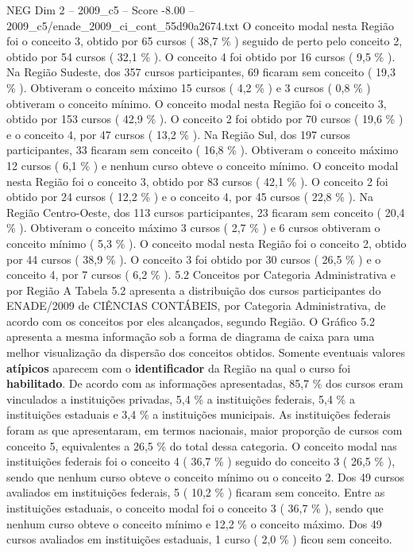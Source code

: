 \begin{textsample}{NEG Dim 2 – 2009\_c5 – Score -8.00 – 2009\_c5/enade\_2009\_ci\_cont\_55d90a2674.txt}
O conceito modal nesta Região foi o conceito 3, obtido por 65 cursos ( 38,7 \% ) seguido de perto pelo conceito 2, obtido por 54 cursos ( 32,1 \% ).
O conceito 4 foi obtido por 16 cursos ( 9,5 \% ).
Na Região Sudeste, dos 357 cursos participantes, 69 ficaram sem conceito ( 19,3 \% ).
Obtiveram o conceito máximo 15 cursos ( 4,2 \% ) e 3 cursos ( 0,8 \% ) obtiveram o conceito mínimo.
O conceito modal nesta Região foi o conceito 3, obtido por 153 cursos ( 42,9 \% ).
O conceito 2 foi obtido por 70 cursos ( 19,6 \% ) e o conceito 4, por 47 cursos ( 13,2 \% ).
Na Região Sul, dos 197 cursos participantes, 33 ficaram sem conceito ( 16,8 \% ).
Obtiveram o conceito máximo 12 cursos ( 6,1 \% ) e nenhum curso obteve o conceito mínimo.
O conceito modal nesta Região foi o conceito 3, obtido por 83 cursos ( 42,1 \% ).
O conceito 2 foi obtido por 24 cursos ( 12,2 \% ) e o conceito 4, por 45 cursos ( 22,8 \% ).
Na Região Centro-Oeste, dos 113 cursos participantes, 23 ficaram sem conceito ( 20,4 \% ).
Obtiveram o conceito máximo 3 cursos ( 2,7 \% ) e 6 cursos obtiveram o conceito mínimo ( 5,3 \% ).
O conceito modal nesta Região foi o conceito 2, obtido por 44 cursos ( 38,9 \% ).
O conceito 3 foi obtido por 30 cursos ( 26,5 \% ) e o conceito 4, por 7 cursos ( 6,2 \% ). 5.2 Conceitos por Categoria Administrativa e por Região A Tabela 5.2 apresenta a distribuição dos cursos participantes do ENADE/2009 de CIÊNCIAS CONTÁBEIS, por Categoria Administrativa, de acordo com os conceitos por eles alcançados, segundo Região.
O Gráfico 5.2 apresenta a mesma informação sob a forma de diagrama de caixa para uma melhor visualização da dispersão dos conceitos obtidos.
Somente eventuais valores \textbf{atípicos} aparecem com o \textbf{identificador} da Região na qual o curso foi \textbf{habilitado}.
De acordo com as informações apresentadas, 85,7 \% dos cursos eram vinculados a instituições privadas, 5,4 \% a instituições federais, 5,4 \% a instituições estaduais e 3,4 \% a instituições municipais.
As instituições federais foram as que apresentaram, em termos nacionais, maior proporção de cursos com conceito 5, equivalentes a 26,5 \% do total dessa categoria.
O conceito modal nas instituições federais foi o conceito 4 ( 36,7 \% ) seguido do conceito 3 ( 26,5 \% ), sendo que nenhum curso obteve o conceito mínimo ou o conceito 2.
Dos 49 cursos avaliados em instituições federais, 5 ( 10,2 \% ) ficaram sem conceito.
Entre as instituições estaduais, o conceito modal foi o conceito 3 ( 36,7 \% ), sendo que nenhum curso obteve o conceito mínimo e 12,2 \% o conceito máximo.
Dos 49 cursos avaliados em instituições estaduais, 1 curso ( 2,0 \% ) ficou sem conceito.

\end{textsample}
